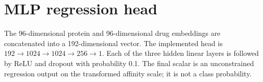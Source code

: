 \section{MLP regression head}
The 96-dimensional protein and 96-dimensional drug embeddings are concatenated into a 192-dimensional vector. The implemented head is $192\to1024\to1024\to256\to1$. Each of the three hidden linear layers is followed by ReLU and dropout with probability 0.1. The final scalar is an unconstrained regression output on the transformed affinity scale; it is not a class probability.
